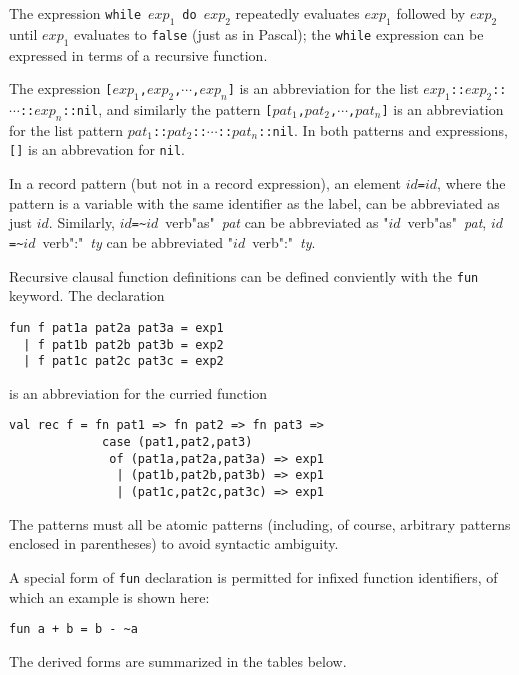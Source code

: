 {{The expression \verb"while"~$exp_1$~\verb"do"~$exp_2$ repeatedly evaluates
$exp_1$ followed by $exp_2$ until $exp_1$ evaluates to \verb"false" 
(just as in Pascal); the \verb"while" expression can be expressed 
in terms of a recursive function.

The expression 
\verb"["$exp_1$\verb","$exp_2$\verb","$\cdots$\verb","$exp_n$\verb"]" is
an abbreviation for the list 
$exp_1$\verb"::"$exp_2$\verb"::"$\cdots$\verb"::"$exp_n$\verb"::nil",
and similarly the pattern
\verb"["$pat_1$\verb","$pat_2$\verb","$\cdots$\verb","$pat_n$\verb"]" is
an abbreviation for the list pattern
$pat_1$\verb"::"$pat_2$\verb"::"$\cdots$\verb"::"$pat_n$\verb"::nil".
In both patterns and expressions, \verb"[]" is an abbrevation for \verb"nil".

In a record pattern (but not in a record expression), an element
$id$\verb"="$id$, where the pattern is a variable with the same identifier
as the label, can be abbreviated as just $id$.  Similarly, 
$id$\verb"=~"$id$~verb"as"~{\it pat} can be abbreviated
as "$id$~verb"as"~{\it pat},
$id$\verb"=~"$id$~verb":"~{\it ty} can be abbreviated
"$id$~verb":"~{\it ty}.

Recursive clausal function definitions can be defined conviently with
the \verb"fun" keyword.  The declaration
\begin{verbatim}
fun f pat1a pat2a pat3a = exp1
  | f pat1b pat2b pat3b = exp2
  | f pat1c pat2c pat3c = exp2
\end{verbatim}
is an abbreviation for the curried function
\begin{verbatim}
val rec f = fn pat1 => fn pat2 => fn pat3 =>
             case (pat1,pat2,pat3)
              of (pat1a,pat2a,pat3a) => exp1
               | (pat1b,pat2b,pat3b) => exp1
               | (pat1c,pat2c,pat3c) => exp1
\end{verbatim}
The patterns must all be atomic patterns (including, of course, 
arbitrary patterns enclosed in parentheses) to avoid syntactic ambiguity.

A special form of \verb"fun" declaration is permitted for infixed
function identifiers, of which an example is shown here:
\begin{verbatim}
fun a + b = b - ~a
\end{verbatim}

The derived forms are summarized in the tables below.

}}
